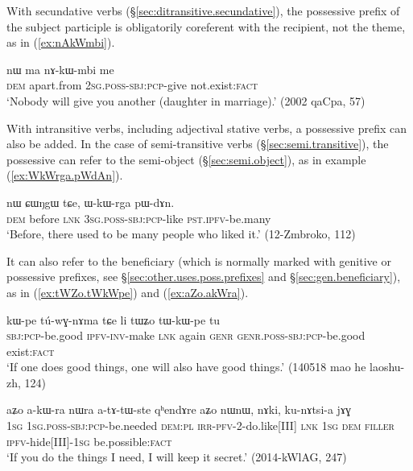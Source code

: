 With secundative verbs (§\ref{sec:ditransitive.secundative}), the possessive prefix of the subject participle is obligatorily coreferent with the recipient, not the theme, as in (\ref{ex:nAkWmbi}).

\begin{exe}
\ex \label{ex:nAkWmbi}
\gll nɯ ma nɤ-kɯ-mbi me \\
\textsc{dem} apart.from \textsc{2sg}.\textsc{poss}-\textsc{sbj}:\textsc{pcp}-give not.exist:\textsc{fact} \\
\glt `Nobody will give you another (daughter in marriage).' (2002 qaCpa, 57)
\end{exe}
With intransitive verbs, including adjectival stative verbs, a possessive prefix can also be added. In the case of semi-transitive verbs (§\ref{sec:semi.transitive}), the possessive can refer to the semi-object (§\ref{sec:semi.object}), as in example (\ref{ex:WkWrga.pWdAn}).

 \begin{exe} 
\ex \label{ex:WkWrga.pWdAn}
\gll  nɯ ɕɯŋgɯ tɕe, ɯ-kɯ-rga pɯ-dɤn. \\
\textsc{dem} before \textsc{lnk} \textsc{3sg}.\textsc{poss}-\textsc{sbj}:\textsc{pcp}-like \textsc{pst}.\textsc{ipfv}-be.many \\
\glt  `Before, there used to be many people who liked it.' (12-Zmbroko, 112)
\end{exe}

It can also refer to the beneficiary (which is normally marked with genitive or possessive prefixes, see §\ref{sec:other.uses.poss.prefixes} and §\ref{sec:gen.beneficiary}), as in (\ref{ex:tWZo.tWkWpe}) and (\ref{ex:aZo.akWra}).

 \begin{exe} 
\ex \label{ex:tWZo.tWkWpe}
\gll  kɯ-pe tú-wɣ-nɤma tɕe li tɯʑo tɯ-kɯ-pe tu \\
\textsc{sbj}:\textsc{pcp}-be.good \textsc{ipfv}-\textsc{inv}-make \textsc{lnk} again \textsc{genr} \textsc{genr}.\textsc{poss}-\textsc{sbj}:\textsc{pcp}-be.good exist:\textsc{fact} \\
\glt  `If one does good things, one will also have good things.' (140518 mao he laoshu-zh, 124)
\end{exe}

 \begin{exe} 
\ex \label{ex:aZo.akWra}
\gll  aʑo a-kɯ-ra nɯra a-tɤ-tɯ-ste qʰendɤre aʑo nɯnɯ, nɤki, ku-nɤtsi-a jɤɣ \\
\textsc{1sg} \textsc{1sg}.\textsc{poss}-\textsc{sbj}:\textsc{pcp}-be.needed \textsc{dem}:\textsc{pl} \textsc{irr}-\textsc{pfv}-2-do.like[III] \textsc{lnk} \textsc{1sg} \textsc{dem} \textsc{filler} \textsc{ipfv}-hide[III]-\textsc{1sg} be.possible:\textsc{fact}  \\
\glt  `If you do the things I need, I will keep it secret.'  (2014-kWlAG, 247)
\end{exe}

